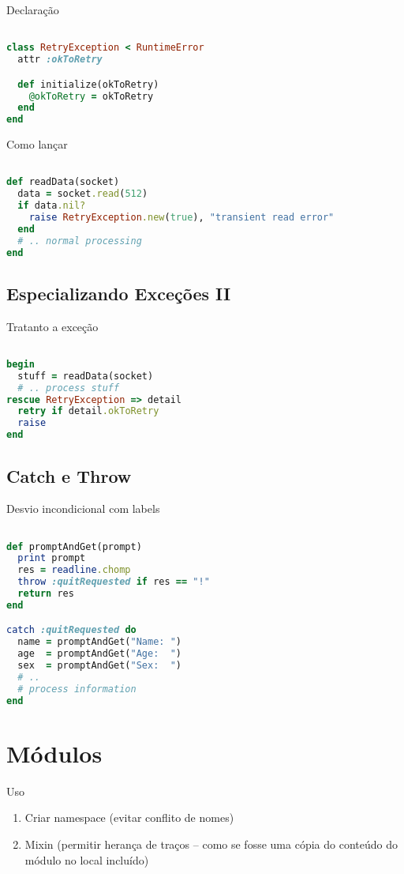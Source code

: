 \documentclass[serif,mathserif]{book}
\begin{document}
Declaração

\begin{lstlisting}[language=ruby]

class RetryException < RuntimeError
  attr :okToRetry

  def initialize(okToRetry)
    @okToRetry = okToRetry
  end
end
\end{lstlisting}

Como lançar

\begin{lstlisting}[language=ruby]

def readData(socket)
  data = socket.read(512)
  if data.nil?
    raise RetryException.new(true), "transient read error"
  end
  # .. normal processing
end
\end{lstlisting}

\section{Especializando Exceções II}

Tratanto a exceção

\begin{lstlisting}[language=ruby]

begin
  stuff = readData(socket)
  # .. process stuff
rescue RetryException => detail
  retry if detail.okToRetry
  raise
end
\end{lstlisting}

\section{Catch e Throw}

Desvio incondicional com labels

\begin{lstlisting}[language=ruby]

def promptAndGet(prompt)
  print prompt
  res = readline.chomp
  throw :quitRequested if res == "!"
  return res
end

catch :quitRequested do
  name = promptAndGet("Name: ")
  age  = promptAndGet("Age:  ")
  sex  = promptAndGet("Sex:  ")
  # ..
  # process information
end
\end{lstlisting}

\chapter{Módulos}
Uso

\begin{enumerate}
  \item Criar namespace (evitar conflito de nomes)
  \item Mixin (permitir herança de traços – como se fosse uma cópia do conteúdo do módulo no local incluído)
\end{enumerate}
\end{document}
